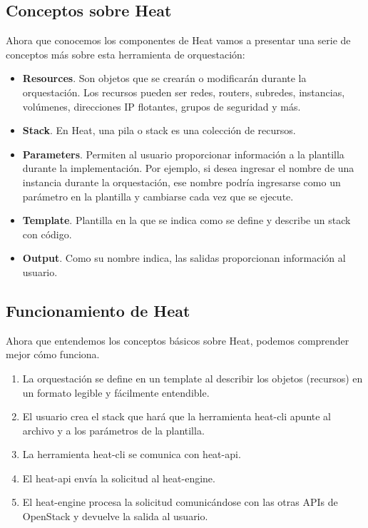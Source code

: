 \subsection{Conceptos sobre Heat}

Ahora que conocemos los componentes de Heat vamos a presentar una serie de conceptos más sobre esta herramienta de orquestación:

\begin{itemize}
\item \textbf{Resources}. Son objetos que se crearán o modificarán durante la orquestación. Los recursos pueden ser redes, routers, subredes, instancias, volúmenes, direcciones IP flotantes, grupos de seguridad y más.
\item \textbf{Stack}. En Heat, una pila o stack es una colección de recursos.
\item \textbf{Parameters}. Permiten al usuario proporcionar información a la plantilla durante la implementación. Por ejemplo, si desea ingresar el nombre de una instancia durante la orquestación, ese nombre podría ingresarse como un parámetro en la plantilla y cambiarse cada vez que se ejecute.
\item \textbf{Template}. Plantilla en la que se indica como se define y describe un stack con código.
\item \textbf{Output}. Como su nombre indica, las salidas proporcionan información al usuario.
\end{itemize}

\subsection{Funcionamiento de Heat}
Ahora que entendemos los conceptos básicos sobre Heat, podemos comprender mejor cómo funciona.

\begin{enumerate}
\item La orquestación se define en un template al describir los objetos (recursos) en un formato legible y fácilmente entendible.
\item El usuario crea el stack que hará que la herramienta heat-cli apunte al archivo y a los parámetros de la plantilla.
\item La herramienta heat-cli se comunica con  heat-api.
\item El heat-api envía la solicitud al heat-engine.
\item El heat-engine procesa la solicitud comunicándose con las otras APIs de OpenStack y devuelve la salida al usuario.
\end{enumerate}

